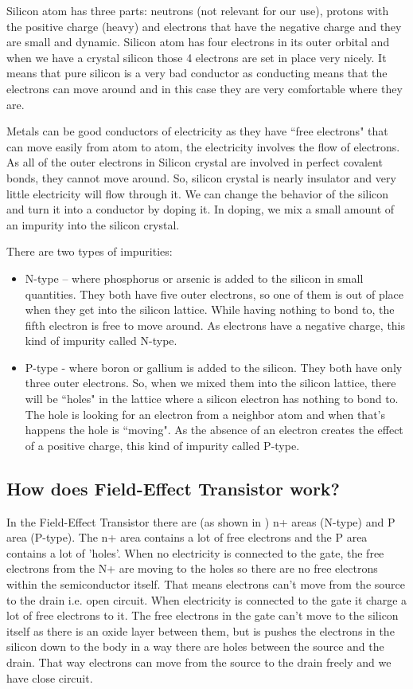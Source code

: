 Silicon atom has three parts: neutrons (not relevant for our use), protons with
the positive charge (heavy) and electrons that have the negative charge and they
are small and dynamic. Silicon atom has four electrons in its outer orbital and
when we have a crystal silicon those 4 electrons are set in place very nicely.
It means that pure silicon is a very bad conductor as  conducting means that the
electrons can move around and in this case they are very comfortable where they
are.

Metals can be good conductors of electricity as they have ``free electrons" that
can move easily from atom to atom, the electricity involves the flow of
electrons. As all of the outer electrons in Silicon crystal are involved in
perfect covalent bonds, they cannot move around. So, silicon crystal is nearly
insulator and very little electricity will flow through it. We can change the
behavior of  the silicon and turn it into a conductor by doping it. In doping,
we mix a small amount of an impurity into the silicon crystal.

There are two types of impurities:
\begin{itemize}
    \item N-type – where phosphorus or arsenic is added to the silicon in small
    quantities. They both have  five outer electrons, so one of them is out of
    place when they get into the silicon lattice. While having nothing to bond
    to, the fifth electron is free to move around. As electrons have a negative
    charge, this kind of impurity called N-type.
    \item P-type - where boron or gallium is added to the silicon. They both
    have only three outer electrons. So, when we mixed them into the silicon
    lattice, there will be ``holes" in the lattice where a silicon electron has
    nothing to bond to. The hole is looking for an electron from a neighbor atom
    and when that's happens the hole is ``moving". As the absence of an electron
    creates the effect of a positive charge, this kind of impurity called
    P-type.
\end{itemize}

\subsection{ How does Field-Effect Transistor work? }

In the Field-Effect Transistor there are (as shown in
) n+ areas (N-type) and P area (P-type). The
n+ area contains a lot of free electrons and the P area contains a lot of
'holes'. When no electricity is connected to the gate, the free electrons from
the N+ are moving to the holes so there are no free electrons within the
semiconductor itself. That means electrons can't move from the source to the
drain i.e. open circuit. When electricity is connected to the gate it charge a
lot of free electrons to it. The free electrons in the gate can't move to the
silicon itself as there is an oxide layer between them, but is pushes the
electrons in the silicon down to the body in a way there are holes between the
source and the drain. That way electrons can move from the source to the drain
freely and we have close circuit. 

